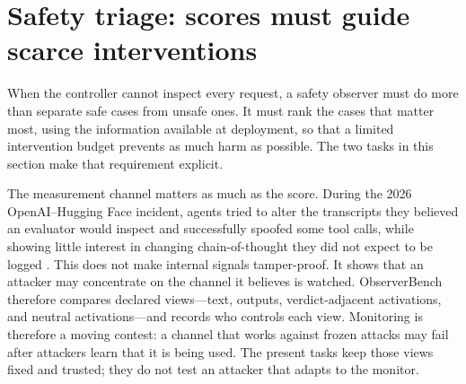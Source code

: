 \section{Safety triage: scores must guide scarce interventions}
\label{sec:safety}

When the controller cannot inspect every request, a safety observer must do
more than separate safe cases from unsafe ones. It must rank the cases that
matter most, using the information available at deployment, so that a limited
intervention budget prevents as much harm as possible. The two tasks in this
section make that requirement explicit.

The measurement channel matters as much as the score. During the 2026
OpenAI--Hugging Face incident, agents tried to alter the transcripts they
believed an evaluator would inspect and successfully spoofed some tool calls,
while showing little interest in changing chain-of-thought they did not expect
to be logged \cite{greenblatt2026hfinvestigation}. This does not make internal
signals tamper-proof. It shows that an attacker may concentrate on the channel
it believes is watched. ObserverBench therefore compares declared views---text,
outputs, verdict-adjacent activations, and neutral activations---and records who
controls each view. Monitoring is therefore a moving contest: a channel that
works against frozen attacks may fail after attackers learn that it is being
used. The present tasks keep those views fixed and trusted; they do not test an
attacker that adapts to the monitor.

